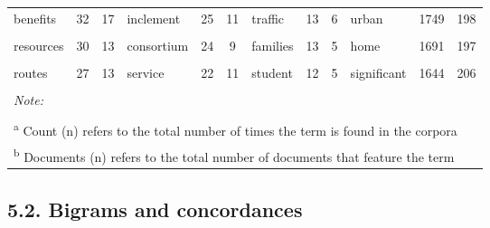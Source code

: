 \documentclass[]{elsarticle} %
\begin{document}
\begin{table}
{\begin{tabular}[t]{lcclcclcclcc}
benefits & 32 & 17 & inclement & 25 & 11 & traffic & 13 & 6 & urban & 1749 & 198\\
\addlinespace
\cellcolor{gray!6}{play} & \cellcolor{gray!6}{31} & \cellcolor{gray!6}{2} & \cellcolor{gray!6}{eligibility} & \cellcolor{gray!6}{24} & \cellcolor{gray!6}{11} & \cellcolor{gray!6}{support} & \cellcolor{gray!6}{13} & \cellcolor{gray!6}{6} & \cellcolor{gray!6}{different} & \cellcolor{gray!6}{1695} & \cellcolor{gray!6}{213}\\
resources & 30 & 13 & consortium & 24 & 9 & families & 13 & 5 & home & 1691 & 197\\
\cellcolor{gray!6}{healthy} & \cellcolor{gray!6}{29} & \cellcolor{gray!6}{16} & \cellcolor{gray!6}{region} & \cellcolor{gray!6}{23} & \cellcolor{gray!6}{10} & \cellcolor{gray!6}{way} & \cellcolor{gray!6}{12} & \cellcolor{gray!6}{5} & \cellcolor{gray!6}{social} & \cellcolor{gray!6}{1672} & \cellcolor{gray!6}{189}\\
routes & 27 & 13 & service & 22 & 11 & student & 12 & 5 & significant & 1644 & 206\\
\cellcolor{gray!6}{lanes} & \cellcolor{gray!6}{26} & \cellcolor{gray!6}{3} & \cellcolor{gray!6}{•} & \cellcolor{gray!6}{21} & \cellcolor{gray!6}{1} & \cellcolor{gray!6}{region} & \cellcolor{gray!6}{12} & \cellcolor{gray!6}{4} & \cellcolor{gray!6}{mobility} & \cellcolor{gray!6}{1634} & \cellcolor{gray!6}{136}\\
\bottomrule
\multicolumn{12}{l}{\rule{0pt}{1em}\textit{Note: }}\\
\multicolumn{12}{l}{\rule{0pt}{1em} }\\
\multicolumn{12}{l}{\rule{0pt}{1em}\textsuperscript{a} Count (n) refers to the total number of times the term is found in the corpora}\\
\multicolumn{12}{l}{\rule{0pt}{1em}\textsuperscript{b} Documents (n) refers to the total number of documents that feature the term}\\
\end{tabular}}
\end{table}

\hypertarget{bigrams-and-concordances}{%
\subsection{5.2. Bigrams and
concordances}\label{bigrams-and-concordances}}
\end{document}
